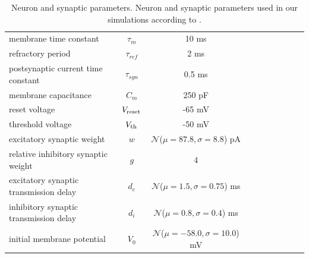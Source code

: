 \documentclass[10pt,a4paper,onecolumn]{article}
\begin{document}
\begin{table}[!ht]
  \caption{\label{table:parameters} Neuron and synaptic parameters. Neuron and synaptic parameters used in our simulations according to \cite{potjans2014}.}
 \begin{center}
  \begin{tabular}{lccccccccc}
   \toprule
   \midrule
 membrane time constant & $\tau_m$ & 10 ms \tabularnewline
 refractory period & $\tau_{ref}$ & 2 ms \tabularnewline
 postsynaptic current time constant & $\tau_{syn}$ & 0.5 ms \tabularnewline
 membrane capacitance & $C_m$ & 250 pF\tabularnewline
 reset voltage & $V_{\rm reset}$ & -65 mV\tabularnewline
 threshold voltage & $V_{\rm th}$ & -50 mV\tabularnewline
 excitatory synaptic weight & $w$ & $\mathcal{N}$($\mu = 87.8, \sigma = 8.8$) pA \tabularnewline
 relative inhibitory synaptic weight & $g$ & 4 \tabularnewline
 excitatory synaptic transmission delay & $d_e$ & $\mathcal{N}$($\mu=1.5 , \sigma = 0.75$) ms \tabularnewline
 inhibitory synaptic transmission delay & $d_i$ & $\mathcal{N}$($\mu = 0.8 , \sigma = 0.4$) ms \tabularnewline
 initial membrane potential & $V_0$ & $\mathcal{N}$($\mu=-58.0, \sigma=10.0$) mV \tabularnewline
   \bottomrule
  \end{tabular}
 \end{center}
\end{table}
\end{document}
